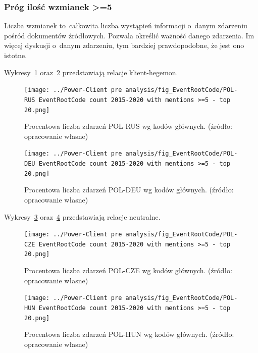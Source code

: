 \documentclass[11pt]{report}
\begin{document}
    \subsubsection{Próg ilość wzmianek >=5}\label{subsubsec:erc:próg-ilość-wzmianek->=5}
    Liczba wzmianek to~całkowita liczba wystąpień informacji o~danym zdarzeniu pośród dokumentów źródłowych.
    Pozwala określić ważność danego zdarzenia.
    Im więcej dyskusji o~danym zdarzeniu, tym bardziej prawdopodobne, że jest ono istotne.

    Wykresy~\ref{fig:Power-Client:ERC:Mentions:POL-RUS} oraz~\ref{fig:Power-Client:ERC:Mentions:POL-DEU} przedstawiają relacje klient-hegemon.

    \begin{figure}[tp]
        \centering
        \texttt{[image: ../Power-Client pre analysis/fig\_EventRootCode/POL-RUS EventRootCode count 2015-2020 with mentions >=5 - top 20.png]}
        \caption{Procentowa liczba zdarzeń POL-RUS wg kodów głównych. (źródło: opracowanie własne)}
        \label{fig:Power-Client:ERC:Mentions:POL-RUS}
    \end{figure}

    \begin{figure}[tp]
        \centering
        \texttt{[image: ../Power-Client pre analysis/fig\_EventRootCode/POL-DEU EventRootCode count 2015-2020 with mentions >=5 - top 20.png]}
        \caption{Procentowa liczba zdarzeń POL-DEU wg kodów głównych. (źródło: opracowanie własne)}
        \label{fig:Power-Client:ERC:Mentions:POL-DEU}
    \end{figure}

    Wykresy~\ref{fig:Power-Client:ERC:Mentions:POL-CZE} oraz~\ref{fig:Power-Client:ERC:Mentions:POL-HUN} przedstawiają relacje neutralne.

    \begin{figure}[tp]
        \centering
        \texttt{[image: ../Power-Client pre analysis/fig\_EventRootCode/POL-CZE EventRootCode count 2015-2020 with mentions >=5 - top 20.png]}
        \caption{Procentowa liczba zdarzeń POL-CZE wg kodów głównych. (źródło: opracowanie własne)}
        \label{fig:Power-Client:ERC:Mentions:POL-CZE}
    \end{figure}

    \begin{figure}[tp]
        \centering
        \texttt{[image: ../Power-Client pre analysis/fig\_EventRootCode/POL-HUN EventRootCode count 2015-2020 with mentions >=5 - top 20.png]}
        \caption{Procentowa liczba zdarzeń POL-HUN wg kodów głównych. (źródło: opracowanie własne)}
        \label{fig:Power-Client:ERC:Mentions:POL-HUN}
    \end{figure}
\end{document}
